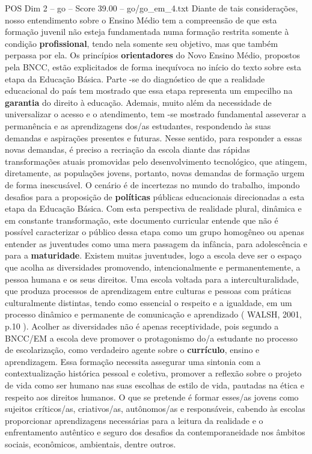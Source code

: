 \begin{textsample}{POS Dim 2 – go – Score 39.00 – go/go\_em\_4.txt}
Diante de tais considerações, nosso entendimento sobre o Ensino Médio tem a compreensão de que esta formação juvenil não esteja fundamentada numa formação restrita somente à condição \textbf{profissional}, tendo nela somente seu objetivo, mas que também perpassa por ela.
Os princípios \textbf{orientadores} do Novo Ensino Médio, propostos pela BNCC, estão explicitados de forma inequívoca no início do texto sobre esta etapa da Educação Básica.
Parte -se do diagnóstico de que a realidade educacional do país tem mostrado que essa etapa representa um empecilho na \textbf{garantia} do direito à educação.
Ademais, muito além da necessidade de universalizar o acesso e o atendimento, tem -se mostrado fundamental asseverar a permanência e as aprendizagens dos/as estudantes, respondendo às suas demandas e aspirações presentes e futuras.
Nesse sentido, para responder a essas novas demandas, é preciso a recriação da escola diante das rápidas transformações atuais promovidas pelo desenvolvimento tecnológico, que atingem, diretamente, as populações jovens, portanto, novas demandas de formação urgem de forma inescusável.
O cenário é de incertezas no mundo do trabalho, impondo desafios para a proposição de \textbf{políticas} públicas educacionais direcionadas a esta etapa da Educação Básica.
Com esta perspectiva de realidade plural, dinâmica e em constante transformação, este documento curricular entende que não é possível caracterizar o público dessa etapa como um grupo homogêneo ou apenas entender as juventudes como uma mera passagem da infância, para adolescência e para a \textbf{maturidade}.
Existem muitas juventudes, logo a escola deve ser o espaço que acolha as diversidades promovendo, intencionalmente e permanentemente, a pessoa humana e os seus direitos.
Uma escola voltada para a interculturalidade, que produza processos de aprendizagem entre culturas e pessoas com práticas culturalmente distintas, tendo como essencial o respeito e a igualdade, em um processo dinâmico e permanente de comunicação e aprendizado ( WALSH, 2001, p.10 ).
Acolher as diversidades não é apenas receptividade, pois segundo a BNCC/EM a escola deve promover o protagonismo do/a estudante no processo de escolarização, como verdadeiro agente sobre o \textbf{currículo}, ensino e aprendizagem.
Essa formação necessita assegurar uma sintonia com a contextualização histórica pessoal e coletiva, promover a reflexão sobre o projeto de vida como ser humano nas suas escolhas de estilo de vida, pautadas na ética e respeito aos direitos humanos.
O que se pretende é formar esses/as jovens como sujeitos críticos/as, criativos/as, autônomos/as e responsáveis, cabendo às escolas proporcionar aprendizagens necessárias para a leitura da realidade e o enfrentamento autêntico e seguro dos desafios da contemporaneidade nos âmbitos sociais, econômicos, ambientais, dentre outros.

\end{textsample}
